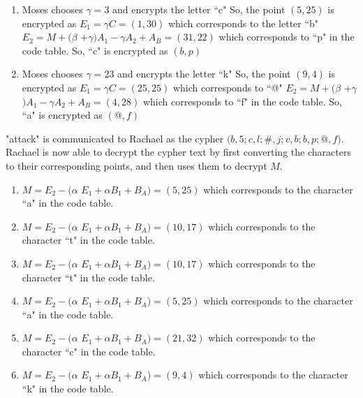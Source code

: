 \begin{eg}
\begin{enumerate}[(1)]
\item Moses chooses $\gamma$$ = 3$ and encrypts the letter ``c" \newline
	So, the point $(5, 25)$ is encrypted as\newline
	$E_1 = $$\gamma$$C = (1, 30)$ which corresponds to the letter ``b"\newline
	$E_2 = M +($$\beta$ $+$$\gamma$$)$$A_1 -$$\gamma$$A_2 + A_B = (31, 22)$ which corresponds to ``p" in the code table.  So, ``c" is encrypted as $(b, p)$
\item Moses chooses $\gamma$$ = 23$ and encrypts the letter ``k" \newline
	So, the point $(9, 4)$ is encrypted as\newline
	$E_1 = $$\gamma$$C = (25, 25)$ which corresponds to ``@"\newline
	$E_2 = M +($$\beta$ $+$$\gamma$$)$$A_1 -$$\gamma$$A_2 + A_B = (4, 28)$ which corresponds to ``f" in the code table.  So, ``a" is encrypted as $(@, f)$
\end{enumerate}
\begin{flushleft}
"attack" is communicated to Rachael as the cypher $(b,5; c,l; $$\#$$,j; v,b; b,p; @,f)$. Rachael is now able to decrypt the cypher text by first converting the characters to their corresponding points, and then uses them to decrypt $M$.
\end{flushleft}
\begin{enumerate}[(1)]
\item $M = E_2 - ($$\alpha$ $E_1 +$$\alpha$$B_1 +B_A) = (5, 25)$ which corresponds to the character ``a" in the code table.\newline
\item $M = E_2 - ($$\alpha$ $E_1 +$$\alpha$$B_1 +B_A) = (10, 17)$ which corresponds to the character ``t" in the code table.\newline
\item $M = E_2 - ($$\alpha$ $E_1 +$$\alpha$$B_1 +B_A) = (10, 17)$ which corresponds to the character ``t" in the code table.\newline
\item $M = E_2 - ($$\alpha$ $E_1 +$$\alpha$$B_1 +B_A) = (5, 25)$ which corresponds to the character ``a" in the code table.\newline
\item $M = E_2 - ($$\alpha$ $E_1 +$$\alpha$$B_1 +B_A) = (21, 32)$ which corresponds to the character ``c" in the code table.\newline
\item $M = E_2 - ($$\alpha$ $E_1 +$$\alpha$$B_1 +B_A) = (9, 4)$ which corresponds to the character ``k" in the code table.\newline
\end{enumerate}
\end{eg} 
